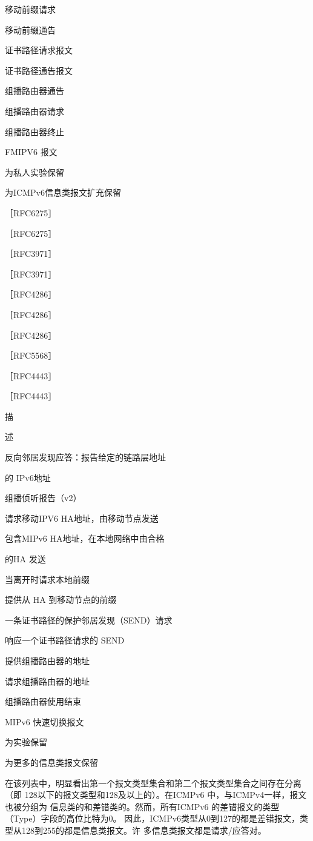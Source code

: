移动前缀请求

移动前缀通告

证书路径请求报文

证书路径通告报文

组播路由器通告

组播路由器请求

组播路由器终止

FMIPV6 报文

为私人实验保留

为ICMPv6信息类报文扩充保留

［RFC6275］

［RFC6275］

［RFC3971］

［RFC3971］

［RFC4286］

［RFC4286］

［RFC4286］

［RFC5568］

［RFC4443］

［RFC4443］

描

述

反向邻居发现应答：报告给定的链路层地址

的 IPv6地址

组播侦听报告（v2）

请求移动IPV6 HA地址，由移动节点发送

包含MIPv6 HA地址，在本地网络中由合格

的HA 发送

当离开时请求本地前缀

提供从 HA 到移动节点的前缀

一条证书路径的保护邻居发现（SEND）请求

响应一个证书路径请求的 SEND

提供组播路由器的地址

请求组播路由器的地址

组播路由器使用结束

MIPv6 快速切换报文

为实验保留

为更多的信息类报文保留

在该列表中，明显看出第一个报文类型集合和第二个报文类型集合之间存在分离（即
128以下的报文类型和128及以上的）。在ICMPv6 中，与ICMPv4一样，报文也被分组为
信息类的和差错类的。然而，所有ICMPv6 的差错报文的类型（Type）字段的高位比特为0。
因此，ICMPv6类型从0到127的都是差错报文，类型从128到255的都是信息类报文。许
多信息类报文都是请求/应答对。

